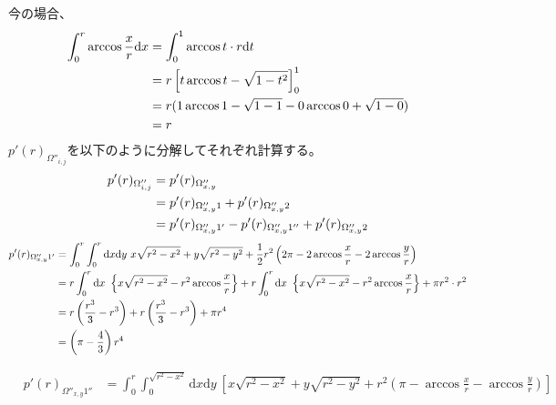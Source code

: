 \documentclass[letterpaper,10pt,english]{sphinxmanual}
\begin{document}
今の場合、
\begin{gather}
\begin{split}\begin{align}
\int^{r}_{0} \arccos \frac{x}{r} \mathrm{d}x &= \int^{1}_{0}\arccos t \cdot r\mathrm{d}t\\
&= r \left[ t \arccos t - \sqrt{1-t^{2}} \right]^{1}_{0}\\
&= r ( 1\arccos1 -\sqrt{1-1} - 0 \arccos0 + \sqrt{1-0})\\
&= r
\end{align}\end{split}\notag
\end{gather}
\(p'(r)_{\Omega''_{i,j}}\)を以下のように分解してそれぞれ計算する。
\begin{gather}
\begin{split}\begin{align}
p'(r)_{\Omega''_{i,j}} &= p'(r)_{\Omega''_{x, y}}\\
&= p'(r)_{\Omega''_{x, y}1}  +p'(r)_{\Omega''_{x, y}2}\\
&= p'(r)_{\Omega''_{x, y}1'} - p'(r)_{\Omega''_{x, y}1''} + p'(r)_{\Omega''_{x, y}2}
\end{align}\end{split}\notag
\end{gather}\begin{gather}
\begin{split}\begin{align}
p'(r)_{\Omega''_{x,y}1'} &= \int^{r}_{0}\int^{r}_{0}\mathrm{d}x\mathrm{d}y\ x\sqrt{r^{2}-x^{2}} + y \sqrt{r^{2} -y^{2}} + \frac{1}{2}r^{2}\left( 2\pi -2\arccos\frac{x}{r} -2\arccos\frac{y}{r} \right) \\
&= r\int^{r}_{0}\mathrm{d}x\ \left\{x\sqrt{r^{2}-x^{2}} - r^{2}\arccos\frac{x}{r} \right\}
+ r\int^{r}_{0}\mathrm{d}x\ \left\{x\sqrt{r^{2}-x^{2}} - r^{2}\arccos\frac{x}{r} \right\} + \pi r^{2}\cdot r^{2}\\
&= r\left( \frac{r^{3}}{3} -r^{3} \right) + r\left( \frac{r^{3}}{3} -r^{3} \right) + \pi r^{4}\\
&=  \left(\pi -\frac{4}{3}\right)r^{4}
\end{align}\end{split}\notag
\end{gather}\begin{gather}
\begin{split}\begin{align}
p'(r)_{\Omega''_{x,y}1''} &= \int^{r}_{0}\int^{\sqrt{r^{2}-x^{2}}}_{0}\mathrm{d}x\mathrm{d}y\ \left[ x\sqrt{r^{2}-x^{2}} + y \sqrt{r^{2} -y^{2}} + r^{2}\left(\pi -\arccos\frac{x}{r} -\arccos\frac{y}{r}\right) \right]\\

\end{align}
\end{split}
\end{gather}
\end{document}
